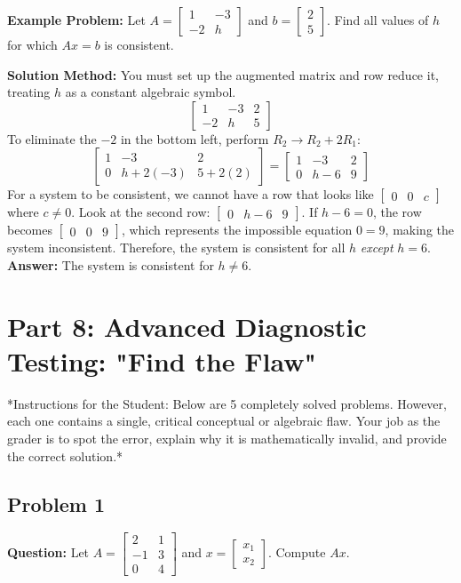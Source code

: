 \documentclass{article}
\begin{document}
\textbf{Example Problem:} Let $A = \begin{bmatrix} 1 & -3 \\ -2 & h \end{bmatrix}$ and $b = \begin{bmatrix} 2 \\ 5 \end{bmatrix}$. Find all values of $h$ for which $Ax = b$ is consistent.

\textbf{Solution Method:}
You must set up the augmented matrix and row reduce it, treating $h$ as a constant algebraic symbol.
\[ \begin{bmatrix} 1 & -3 & 2 \\ -2 & h & 5 \end{bmatrix} \]
To eliminate the $-2$ in the bottom left, perform $R_2 \to R_2 + 2R_1$:
\[ \begin{bmatrix} 1 & -3 & 2 \\ 0 & h + 2(-3) & 5 + 2(2) \end{bmatrix} = \begin{bmatrix} 1 & -3 & 2 \\ 0 & h - 6 & 9 \end{bmatrix} \]
For a system to be consistent, we cannot have a row that looks like $\begin{bmatrix} 0 & 0 & c \end{bmatrix}$ where $c \neq 0$.
Look at the second row: $\begin{bmatrix} 0 & h - 6 & 9 \end{bmatrix}$. 
If $h - 6 = 0$, the row becomes $\begin{bmatrix} 0 & 0 & 9 \end{bmatrix}$, which represents the impossible equation $0 = 9$, making the system inconsistent.
Therefore, the system is consistent for all $h$ \textit{except} $h = 6$. 
\textbf{Answer:} The system is consistent for $h \neq 6$.

\newpage
\section{Part 8: Advanced Diagnostic Testing: "Find the Flaw"}
*Instructions for the Student: Below are 5 completely solved problems. However, each one contains a single, critical conceptual or algebraic flaw. Your job as the grader is to spot the error, explain why it is mathematically invalid, and provide the correct solution.*

\subsection{Problem 1}
\textbf{Question:} Let $A = \begin{bmatrix} 2 & 1 \\ -1 & 3 \\ 0 & 4 \end{bmatrix}$ and $x = \begin{bmatrix} x_1 \\ x_2 \end{bmatrix}$. Compute $Ax$.
\end{document}
